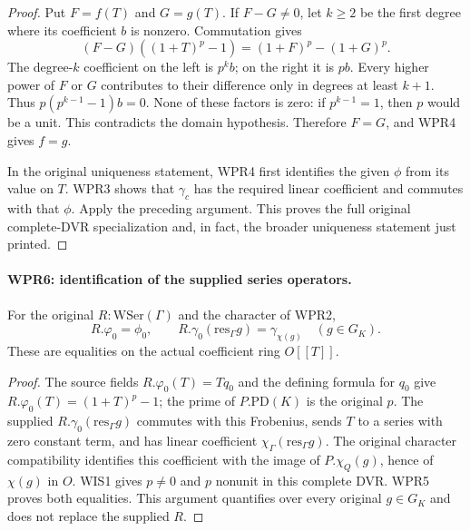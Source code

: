 \begin{proof}
Put $F=f(T)$ and $G=g(T)$. If $F-G\neq0$, let $k\geq2$ be
the first degree where its coefficient $b$ is nonzero.
Commutation gives
\[
 (F-G)((1+T)^p-1)=(1+F)^p-(1+G)^p.
\]
The degree-$k$ coefficient on the left is $p^k b$; on the right
it is $p b$. Every higher power of $F$ or $G$ contributes to
their difference only in degrees at least $k+1$. Thus
$p(p^{k-1}-1)b=0$. None of these factors is zero: if
$p^{k-1}=1$, then $p$ would be a unit. This contradicts the
domain hypothesis. Therefore $F=G$, and WPR4 gives $f=g$.

In the original uniqueness statement, WPR4 first identifies the
given $\phi$ from its value on $T$. WPR3 shows that $\gamma_c$
has the required linear coefficient and commutes with that $\phi$.
Apply the preceding argument. This proves the full original
complete-DVR specialization and, in fact, the broader uniqueness
statement just printed.
\end{proof}

\paragraph{WPR6: identification of the supplied series operators.}
\label{claim:WPR6}
For the original $R:\mathrm{WSer}(\Gamma)$ and the character
of WPR2,
\[
 R.\varphi_0=\phi_0,
 \qquad R.\gamma_0(\mathrm{res}_\Gamma g)=\gamma_{\chi(g)}
                         \quad(g\in G_K).
 \tag{WPR.8}
\]
These are equalities on the actual coefficient ring $O[[T]]$.

\begin{proof}
The source fields $R.\varphi_0(T)=Tq_0$ and the defining
formula for $q_0$ give $R.\varphi_0(T)=(1+T)^p-1$;
the prime of $P.\mathrm{PD}(K)$ is the original $p$.
The supplied $R.\gamma_0(\mathrm{res}_\Gamma g)$ commutes with
this Frobenius, sends $T$ to a series with zero constant term,
and has linear coefficient $\chi_\Gamma(\mathrm{res}_\Gamma g)$.
The original character compatibility identifies this coefficient
with the image of $P.\chi_Q(g)$, hence of $\chi(g)$ in $O$.
WIS1 gives $p\neq0$ and $p$ nonunit in this complete DVR.
WPR5 proves both equalities. This argument quantifies over every
original $g\in G_K$ and does not replace the supplied $R$.
\end{proof}

